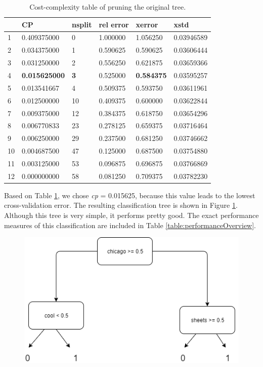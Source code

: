 \documentclass[a4paper,11pt]{article}
\begin{document}
\begin{table}[H]
\centering
\caption{Cost-complexity table of pruning the original tree.}
\label{table:cp}
\begin{tabular}{|l|l|l|l|l|l|}
\hline
   & CP          & nsplit & rel error & xerror   & xstd       \\
   \hline
1  & 0.409375000 & 0      & 1.000000  & 1.056250 & 0.03946589 \\
2  & 0.034375000 & 1      & 0.590625  & 0.590625 & 0.03606444 \\
3  & 0.031250000 & 2      & 0.556250  & 0.621875 & 0.03659366 \\
4  & \textbf{0.015625000} & \textbf{3}      & 0.525000  & \textbf{0.584375} & 0.03595257 \\
5  & 0.013541667 & 4      & 0.509375  & 0.593750 & 0.03611961 \\
6  & 0.012500000 & 10     & 0.409375  & 0.600000 & 0.03622844 \\
7  & 0.009375000 & 12     & 0.384375  & 0.618750 & 0.03654296 \\
8  & 0.006770833 & 23     & 0.278125  & 0.659375 & 0.03716464 \\
9  & 0.006250000 & 29     & 0.237500  & 0.681250 & 0.03746662 \\
10 & 0.004687500 & 47     & 0.125000  & 0.687500 & 0.03754880 \\
11 & 0.003125000 & 53     & 0.096875  & 0.696875 & 0.03766869 \\
12 & 0.000000000 & 58     & 0.081250  & 0.709375 & 0.03782230 \\
\hline
\end{tabular}
\end{table}

Based on Table \ref{table:cp}, we chose \textit{cp} = 0.015625, because this value leads to the lowest cross-validation error. The resulting classification tree is shown in Figure \ref{figure:classTree}. Although this tree is very simple, it performs pretty good. The exact performance measures of this classification are included in Table \ref{table:performanceOverview}.

\begin{figure}[H]
\label{figure:classTree}
\centering
\includegraphics[width=0.7\linewidth]{classTree.png}
\end{figure}
\end{document}
